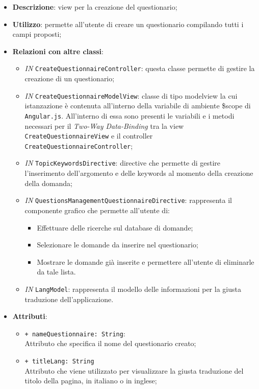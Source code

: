 \begin{itemize}
	\item \textbf{Descrizione}: view per la creazione del questionario;
	\item \textbf{Utilizzo}: permette all'utente di creare un questionario compilando tutti i campi proposti;
	\item \textbf{Relazioni con altre classi}:
	\begin{itemize}
		\item \textit{IN} \texttt{CreateQuestionnaireController}:  questa classe permette di gestire la creazione di un questionario;
		\item \textit{IN} \texttt{CreateQuestionnaireModelView}: classe di tipo modelview la cui istanzazione è contenuta all'interno della variabile di ambiente \$scope di \texttt{Angular.js}. All'interno di essa sono presenti le variabili e i metodi necessari per il \textit{Two-Way Data-Binding} tra la view \texttt{CreateQuestionnaireView} e il controller \texttt{CreateQuestionnaireController};
		\item \textit{IN} \texttt{TopicKeywordsDirective}: directive che permette di gestire l'inserimento dell'argomento e delle keywords al momento della creazione della domanda;
		\item \textit{IN} \texttt{QuestionsManagementQuestionnaireDirective}: rappresenta il componente grafico che permette all'utente di:
		\begin{itemize}
			\item Effettuare delle ricerche sul database di domande;
			\item Selezionare le domande da inserire nel questionario;
			\item Mostrare le domande già inserite e permettere all'utente di eliminarle da tale lista.
		\end{itemize}
		\item \textit{IN} \texttt{LangModel}: rappresenta il modello delle informazioni per la giusta traduzione dell'applicazione.
	\end{itemize}
		\item \textbf{Attributi}:
		\begin{itemize}
			\item \texttt{+ nameQuestionnaire: String}: \\ Attributo che specifica il nome del questionario creato;
			\item \texttt{+ titleLang: String} \\ Attributo che viene utilizzato per visualizzare la giusta traduzione del titolo della pagina, in italiano o in inglese;

\end{itemize}
\end{itemize}

